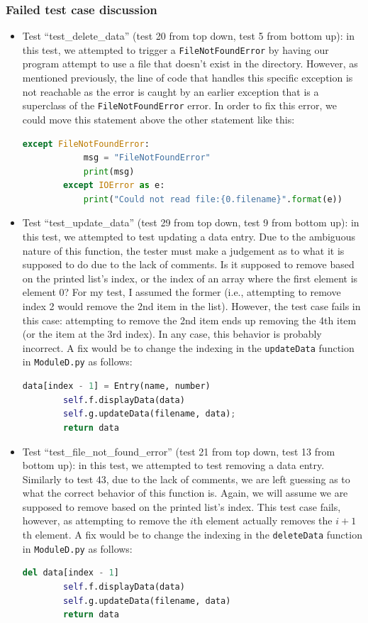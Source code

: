 \documentclass[12pt, letterpaper, titlepage]{article}
\begin{document}
\subsubsection*{Failed test case discussion}
\begin{itemize}
    \item Test ``test\_delete\_data'' (test 20 from top down, test 5 from bottom up): in this test, we attempted to trigger a \lstinline{FileNotFoundError} by having our program attempt to use a file that doesn't exist in the directory. However, as mentioned previously, the line of code that handles this specific exception is not reachable as the error is caught by an earlier exception that is a superclass of the \lstinline{FileNotFoundError} error. In order to fix this error, we could move this statement above the other statement like this:
    \begin{lstlisting}[language=Python, style=style]
        except FileNotFoundError:
            msg = "FileNotFoundError"
            print(msg)
        except IOError as e:
            print("Could not read file:{0.filename}".format(e))
    \end{lstlisting}
    \item Test ``test\_update\_data'' (test 29 from top down, test 9 from bottom up): in this test, we attempted to test updating a data entry. Due to the ambiguous nature of this function, the tester must make a judgement as to what it is supposed to do due to the lack of comments. Is it supposed to remove based on the printed list's index, or the index of an array where the first element is element 0? For my test, I assumed the former (i.e., attempting to remove index 2 would remove the 2nd item in the list). However, the test case fails in this case: attempting to remove the 2nd item ends up removing the 4th item (or the item at the 3rd index). In any case, this behavior is probably incorrect. A fix would be to change the indexing in the \lstinline{updateData} function in \lstinline{ModuleD.py} as follows:
    \begin{lstlisting}[language=Python, style=style]
        data[index - 1] = Entry(name, number)
        self.f.displayData(data)
        self.g.updateData(filename, data);
        return data
    \end{lstlisting}
    \item Test ``test\_file\_not\_found\_error'' (test 21 from top down, test 13 from bottom up): in this test, we attempted to test removing a data entry. Similarly to test 43, due to the lack of comments, we are left guessing as to what the correct behavior of this function is. Again, we will assume we are supposed to remove based on the printed list's index. This test case fails, however, as attempting to remove the $i$th element actually removes the $i+1$th element. A fix would be to change the indexing in the \lstinline{deleteData} function in \lstinline{ModuleD.py} as follows:
    \begin{lstlisting}[language=Python, style=style]
        del data[index - 1]
        self.f.displayData(data)
        self.g.updateData(filename, data)
        return data
    \end{lstlisting}
\end{itemize}
\end{document}

